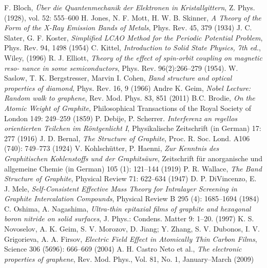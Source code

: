 \begin{thebibliography}{99}

 F. Bloch, \textit{Über die Quantenmechanik der Elektronen in Kristallgittern}, Z. Phys. (1928), vol. 52: 555–600
 H. Jones, N. F. Mott,  H. W. B. Skinner, \textit{A Theory of the Form of the X-Ray Emission Bands of Metals}, Phys. Rev. 45, 379 (1934)
 J. C. Slater, G. F. Koster, \textit{Simplified LCAO Method for the Periodic Potential Problem}, Phys. Rev. 94, 1498 (1954)
 C. Kittel, \textit{Introduction to Solid State Physics, 7th ed.}, Wiley, (1996) 
 R. J. Elliott, \textit{Theory of the effect of spin-orbit coupling on magnetic reso-
nance in some semiconductors}, Phys. Rev. 96(2):266–279 (1954).
 W. Saslow, T. K. Bergstresser, Marvin I. Cohen, \textit{Band structure and optical properties of diamond}, Phys. Rev. 16, 9 (1966)
 Andre K. Geim, \textit{Nobel Lecture: Random walk to graphene}, Rev. Mod. Phys. 83, 851 (2011)
 B.C. Brodie, \textit{On the Atomic Weight of Graphite},  Philosophical Transactions of the Royal Society of London 149: 249–259 (1859)
 P. Debije, P. Scherrer. \textit{Interferenz an regellos orientierten Teilchen im Röntgenlicht I}, Physikalische Zeitschrift (in German) 17: 277 (1916)
 J. D. Bernal, \textit{The Structure of Graphite}, Proc. R. Soc. Lond. A106 (740): 749–773 (1924)
 V. Kohlschütter, P. Haenni, \textit{Zur Kenntnis des Graphitischen Kohlenstoffs und der Graphitsäure}, Zeitschrift für anorganische und allgemeine Chemie (in German) 105 (1): 121–144  (1919)
 P. R. Wallace, \textit{The Band Structure of Graphite}, Physical Review 71: 622–634 (1947)
 D. P. DiVincenzo, E. J. Mele, \textit{Self-Consistent Effective Mass Theory for Intralayer Screening in Graphite Intercalation Compounds}, Physical Review B 295 (4): 1685–1694 (1984)
 C. Oshima, A. Nagashima, \textit{Ultra-thin epitaxial films of graphite and hexagonal boron nitride on solid surfaces}, J. Phys.: Condens. Matter 9: 1–20. (1997)
 K. S. Novoselov, A. K. Geim, S. V. Morozov, D. Jiang; Y. Zhang, S. V. Dubonos, I. V. Grigorieva, A. A. Firsov, \textit{Electric Field Effect in Atomically Thin Carbon Films}, Science 306 (5696): 666–669 (2004)
 A. H. Castro Neto et al., \textit{The electronic properties of graphene}, Rev. Mod. Phys., Vol. 81, No. 1, January–March (2009)

\end{thebibliography}
